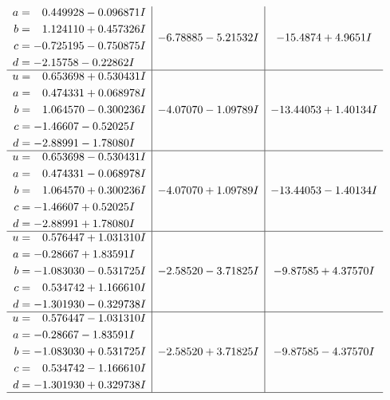 \documentclass[1p]{elsarticle_modified}
\theoremstyle{definition}
\begin{document}
$$\begin{array}{c|c|c}
\begin{aligned}
a &= \phantom{-}0.449928 - 0.096871 I \\
b &= \phantom{-}1.124110 + 0.457326 I \\
c &= -0.725195 - 0.750875 I \\
d &= -2.15758 - 0.22862 I\end{aligned}
 & -6.78885 - 5.21532 I & -15.4874 + 4.9651 I \\ \hline\begin{aligned}
u &= \phantom{-}0.653698 + 0.530431 I \\
a &= \phantom{-}0.474331 + 0.068978 I \\
b &= \phantom{-}1.064570 - 0.300236 I \\
c &= -1.46607 - 0.52025 I \\
d &= -2.88991 - 1.78080 I\end{aligned}
 & -4.07070 - 1.09789 I & -13.44053 + 1.40134 I \\ \hline\begin{aligned}
u &= \phantom{-}0.653698 - 0.530431 I \\
a &= \phantom{-}0.474331 - 0.068978 I \\
b &= \phantom{-}1.064570 + 0.300236 I \\
c &= -1.46607 + 0.52025 I \\
d &= -2.88991 + 1.78080 I\end{aligned}
 & -4.07070 + 1.09789 I & -13.44053 - 1.40134 I \\ \hline\begin{aligned}
u &= \phantom{-}0.576447 + 1.031310 I \\
a &= -0.28667 + 1.83591 I \\
b &= -1.083030 - 0.531725 I \\
c &= \phantom{-}0.534742 + 1.166610 I \\
d &= -1.301930 - 0.329738 I\end{aligned}
 & -2.58520 - 3.71825 I & -9.87585 + 4.37570 I \\ \hline\begin{aligned}
u &= \phantom{-}0.576447 - 1.031310 I \\
a &= -0.28667 - 1.83591 I \\
b &= -1.083030 + 0.531725 I \\
c &= \phantom{-}0.534742 - 1.166610 I \\
d &= -1.301930 + 0.329738 I\end{aligned}
 & -2.58520 + 3.71825 I & -9.87585 - 4.37570 I\\
 \hline 
 \end{array}$$\newpage$$\begin{array}{c|c|c}  

\end{array}$$
\end{document}

